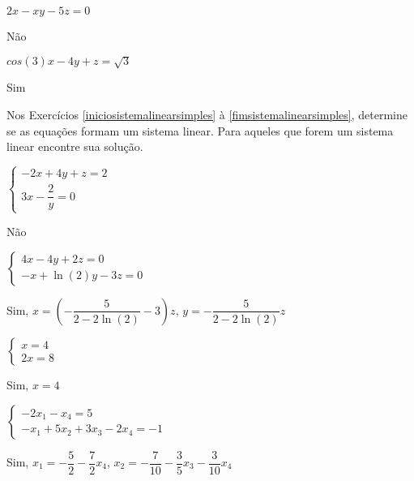 \documentclass[12pt]{exam}
\begin{document}
\begin{exercicio}
    $2x - xy - 5z = 0$
    \begin{solucao}
        Não
    \end{solucao}
\end{exercicio}

\begin{exercicio}\label{fimequacoeslineares}
    $cos(3)x - 4y + z = \sqrt{3}$
    \begin{solucao}
        Sim
    \end{solucao}
\end{exercicio}

Nos Exercícios \ref{iniciosistemalinearsimples} à \ref{fimsistemalinearsimples}, determine se as equações formam um sistema linear. Para aqueles que forem um sistema linear encontre sua solução.

\begin{exercicio}\label{iniciosistemalinearsimples}
    $\begin{cases} -2x + 4y + z = 2\\ 3x - \dfrac{2}{y} = 0\end{cases}$
    \begin{solucao}
        Não
    \end{solucao}
\end{exercicio}

\begin{exercicio}
    $\begin{cases} 4x - 4y + 2z = 0\\ -x + \ln(2)y - 3z = 0\end{cases}$
    \begin{solucao}
        Sim, $x = \left(-\dfrac{5}{2 - 2\ln(2)} - 3\right)z$, $y = -\dfrac{5}{2 - 2\ln(2)}z$
    \end{solucao}
\end{exercicio}

\begin{exercicio}
    $\begin{cases} x = 4\\ 2x = 8\end{cases}$
    \begin{solucao}
        Sim, $x = 4$
    \end{solucao}
\end{exercicio}

\begin{exercicio}
    $\begin{cases} -2x_1 - x_4 = 5\\ -x_1 + 5x_2 + 3x_3 - 2x_4 = -1\end{cases}$
    \begin{solucao}
        Sim, $x_1 = -\dfrac{5}{2} - \dfrac{7}{2}x_4$, $x_2 = -\dfrac{7}{10} - \dfrac{3}{5}x_3 - \dfrac{3}{10}x_4$
    \end{solucao}
\end{exercicio}
\end{document}
